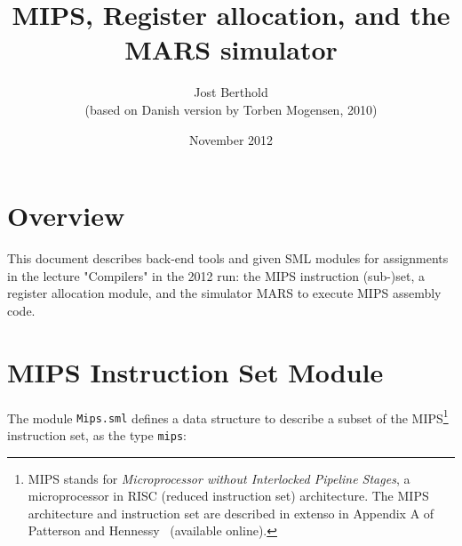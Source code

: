 \documentclass[11pt,a4paper]{article}
\title{MIPS, Register allocation, and the MARS simulator}
\author{Jost Berthold\\ (based on Danish version by Torben Mogensen, 2010)}
\date{November 2012}
\newcommand{\codesize}{\scriptsize}
\newcommand{\cd}[1]{{{\codesize\tt #1}}}
\begin{document}
\setlength{\parindent}{0.2em}

\maketitle


\section*{Overview}

This document describes back-end tools and given SML modules for assignments 
in the lecture "Compilers" in the 2012 run: the MIPS instruction (sub-)set,
a register allocation module, and the simulator MARS to execute MIPS assembly code.

\tableofcontents

\section{MIPS Instruction Set Module}

The module \cd{Mips.sml} defines a data structure to describe a subset of the 
MIPS\footnote{MIPS stands for \emph{Microprocessor without 
Interlocked Pipeline Stages}, a microprocessor in RISC (reduced instruction set)
architecture. The MIPS architecture and instruction set are described in
 extenso in Appendix A of Patterson and
	 Hennessy~\cite{PattersonHennessy} (available online).}
instruction set, as the type \cd{mips}:
\end{document}
